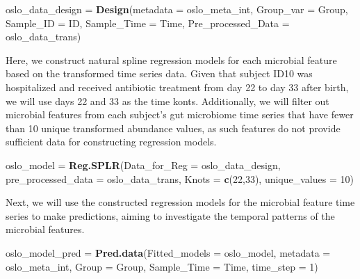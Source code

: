 \documentclass[
]{article}
\newenvironment{Shaded}{\begin{snugshade}}{\end{snugshade}}
\newcommand{\AttributeTok}[1]{\textcolor[rgb]{0.13,0.29,0.53}{#1}}
\newcommand{\DecValTok}[1]{\textcolor[rgb]{0.00,0.00,0.81}{#1}}
\newcommand{\FunctionTok}[1]{\textcolor[rgb]{0.13,0.29,0.53}{\textbf{#1}}}
\newcommand{\NormalTok}[1]{#1}
\newcommand{\OtherTok}[1]{\textcolor[rgb]{0.56,0.35,0.01}{#1}}
\newcommand{\StringTok}[1]{\textcolor[rgb]{0.31,0.60,0.02}{#1}}
\begin{document}
\begin{Shaded}
\begin{Highlighting}[]
\NormalTok{oslo\_data\_design }\OtherTok{=} \FunctionTok{Design}\NormalTok{(}\AttributeTok{metadata =}\NormalTok{ oslo\_meta\_int,}
                          \AttributeTok{Group\_var =} \StringTok{\textquotesingle{}Group\textquotesingle{}}\NormalTok{,}
                          \AttributeTok{Sample\_ID =} \StringTok{\textquotesingle{}ID\textquotesingle{}}\NormalTok{,}
                          \AttributeTok{Sample\_Time =} \StringTok{\textquotesingle{}Time\textquotesingle{}}\NormalTok{,}
                          \AttributeTok{Pre\_processed\_Data =}\NormalTok{ oslo\_data\_trans)}
\end{Highlighting}
\end{Shaded}

Here, we construct natural spline regression models for each microbial
feature based on the transformed time series data. Given that subject
ID10 was hospitalized and received antibiotic treatment from day 22 to
day 33 after birth, we will use days 22 and 33 as the time konts.
Additionally, we will filter out microbial features from each subject's
gut microbiome time series that have fewer than 10 unique transformed
abundance values, as such features do not provide sufficient data for
constructing regression models.

\begin{Shaded}
\begin{Highlighting}[]
\NormalTok{oslo\_model }\OtherTok{=} \FunctionTok{Reg.SPLR}\NormalTok{(}\AttributeTok{Data\_for\_Reg =}\NormalTok{ oslo\_data\_design,}
                      \AttributeTok{pre\_processed\_data =}\NormalTok{ oslo\_data\_trans,}
                      \AttributeTok{Knots =} \FunctionTok{c}\NormalTok{(}\DecValTok{22}\NormalTok{,}\DecValTok{33}\NormalTok{),}
                      \AttributeTok{unique\_values =} \DecValTok{10}\NormalTok{)}
\end{Highlighting}
\end{Shaded}

Next, we will use the constructed regression models for the microbial
feature time series to make predictions, aiming to investigate the
temporal patterns of the microbial features.

\begin{Shaded}
\begin{Highlighting}[]
\NormalTok{oslo\_model\_pred }\OtherTok{=} \FunctionTok{Pred.data}\NormalTok{(}\AttributeTok{Fitted\_models =}\NormalTok{ oslo\_model,}
                            \AttributeTok{metadata =}\NormalTok{ oslo\_meta\_int,}
                            \AttributeTok{Group =} \StringTok{\textquotesingle{}Group\textquotesingle{}}\NormalTok{,}
                            \AttributeTok{Sample\_Time =} \StringTok{\textquotesingle{}Time\textquotesingle{}}\NormalTok{,}
                            \AttributeTok{time\_step =} \DecValTok{1}\NormalTok{)}
\end{Highlighting}
\end{Shaded}
\end{document}
